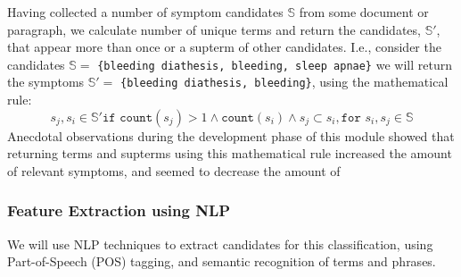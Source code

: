 \documentclass[10pt,letterpaper,final]{article}
\begin{document}

Having collected a number of symptom candidates $\mathbb{S}$ from some
document or paragraph, we calculate number of unique terms and return
the candidates, $\mathbb{S'}$, that appear more than once or a supterm of
other candidates. I.e., consider the candidates $\mathbb{S} = $
\texttt{\{bleeding diathesis, bleeding, sleep apnae\}} we will return
the symptoms $\mathbb{S'} = $ \texttt{\{bleeding diathesis, bleeding\}},
using the mathematical rule:
\begin{equation}
 s_{j}, s_{i} \in \mathbb{S'}\texttt{if count}(s_{j}) > 1 \wedge\texttt{count}(s_{i}) \wedge s_{j} \subset s_{i}, \texttt{for } s_{i}, s_{j} \in \mathbb{S}
\end{equation}
Anecdotal observations during the development phase of this module
showed that returning terms and supterms using this mathematical rule
increased the amount of relevant symptoms, and seemed to decrease the
amount of 


\subsubsection{Feature Extraction using NLP}
We will use NLP techniques to extract candidates for this
classification, using Part-of-Speech (POS)
tagging, and semantic
recognition of terms and phrases.




\end{document}
